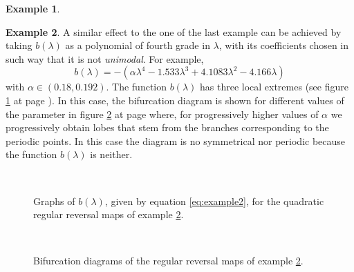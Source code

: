 \documentclass[10pt,twoside,titlepage]{book}
\numberwithin{equation}{chapter}
\numberwithin{figure}{chapter}
\numberwithin{table}{chapter}
\theoremstyle{plain}%
\theoremstyle{definition}
\newtheorem{example}{Example}[chapter]
\theoremstyle{remark}
\begin{document}
\begin{example}
\end{example}

\begin{example}
	\label{eg:example2}
	A similar effect to the one of the last example can be achieved by taking  $b(\lambda)$ as a polynomial of fourth grade in $\lambda$, with its coefficients chosen in such way that it is not \emph{unimodal}. For example,
	\begin{equation}
		b(\lambda)=-\left(\alpha\lambda^{4}-1.533\lambda^{3}+4.1083\lambda^{2}-4.166\lambda\right)
		\label{eq:example2}
	\end{equation}
	with $\alpha\in(0.18,0.192)$. The function $b(\lambda)$ has three local extremes (see figure \ref{fig:blambda2} at page \pageref{fig:blambda2}). In this case, the bifurcation diagram is shown for different values of the parameter in figure \ref{fig:diagbif2} at page \pageref{fig:diagbif2} where, for progressively higher values of $\alpha$ we progressively obtain lobes that stem from the branches corresponding to the periodic points. In this case the diagram is no symmetrical nor periodic because the function $b(\lambda)$ is neither.
	
	\begin{figure}
		\centering
		\\
		\caption{Graphs of $b(\lambda)$, given by equation \ref{eq:example2}, for the quadratic regular reversal maps of example \ref{eg:example2}.}
		\label{fig:blambda2}
	\end{figure}
	
	\begin{figure}
		\centering
		\\
		\caption{Bifurcation diagrams of the regular reversal maps of example \ref{eg:example2}.}
		\label{fig:diagbif2}
	\end{figure}
	
\end{example}
\end{document}
